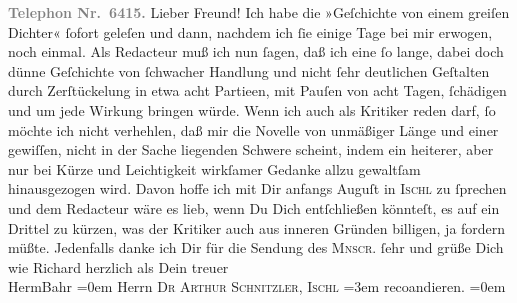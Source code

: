 \begin{ledgroupsized}[t]{13cm}
           \textcolor{gray}{\textbf{Telephon Nr. 6415.}}\pend
           \pstart{}Lieber Freund!\pend\pstart
           Ich habe die »Geſchichte von einem greiſen
                  Dichter« ſofort geleſen und dann, nachdem ich ſie einige Tage bei mir
               erwogen, noch einmal. Als Redacteur muß ich nun ſagen, daß ich eine ſo lange, dabei
               doch dünne Geſchichte von ſchwacher Handlung und nicht ſehr deutlichen Geſtalten
               durch Zerſtückelung in etwa acht Partieen, mit Pauſen von acht Tagen, ſchädigen und
               um jede Wirkung bringen würde. Wenn ich auch als Kritiker reden darf, ſo möchte ich
               nicht verhehlen, daß mir die Novelle von unmäßiger Länge und {\pb}einer gewiſſen, nicht in der Sache liegenden
               Schwere scheint, indem ein heiterer, aber nur bei Kürze und Leichtigkeit wirkſamer
               Gedanke allzu gewaltſam hinausgezogen wird. Davon hoffe ich mit Dir anfangs Auguſt in
                  \textsc{Ischl} zu ſprechen und dem Redacteur wäre es lieb, wenn Du Dich entſchließen könnteſt,
               es auf ein Drittel zu kürzen, was der Kritiker auch aus inneren Gründen billigen, ja
               fordern müßte. Jedenfalls danke ich Dir für die Sendung des \textsc{Mnscr}. ſehr und grüße Dich wie Richard herzlich\pend
           \pstart
           als Dein treuer{\\[\baselineskip]}\spacefill\mbox{HermBahr}\pend
           \leftskip=0em{}\pstart
           \noindent{}Herrn \textsc{Dr Arthur Schnitzler, Ischl}\pend
           \leftskip=3em{}\pstart
           \noindent{}reco{\geminationm}andieren.\pend
           \leftskip=0em{}\pstart
           \textcolor{gray}{\textbf{\label{T_L00465_1v}\label{T_L00465_1h}}}\pend
           
         
         \endnumbering{}\end{ledgroupsized}  \newcommand{\dateiname}{L00465}\newcommand{\titel}{Hermann Bahr an Arthur Schnitzler, 23. 7. 1895}\newcommand{\editorInnen}{ Kurt Ifkovits,  Martin Anton Müller}
      
